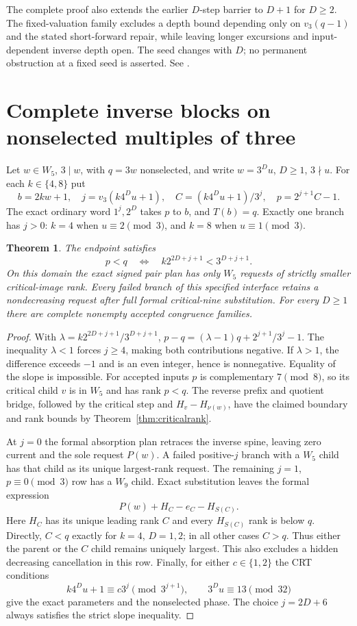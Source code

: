 \documentclass[11pt]{article}
\newtheorem{theorem}{Theorem}
\begin{document}
The complete proof also extends the earlier $D$-step barrier to $D+1$
for $D\ge2$. The fixed-valuation family excludes a depth bound depending
only on $v_3(q-1)$ and the stated short-forward repair, while leaving
longer excursions and input-dependent inverse depth open. The seed
changes with $D$; no permanent obstruction at a fixed seed is asserted.
See
.

\section{Complete inverse blocks on nonselected multiples of three}
Let $w\in W_5$, $3\mid w$, with $q=3w$ nonselected, and write
$w=3^Du$, $D\ge1$, $3\nmid u$. For each $k\in\{4,8\}$ put
\[
 b=2kw+1,\quad j=v_3(k4^Du+1),\quad
 C=(k4^Du+1)/3^j,\quad p=2^{j+1}C-1.
\]
The exact ordinary word $1^j,2^D$ takes $p$ to $b$, and $T(b)=q$.
Exactly one branch has $j>0$: $k=4$ when $u\equiv2\pmod3$, and
$k=8$ when $u\equiv1\pmod3$.

\begin{theorem}\label{thm:multipleinverse}
The endpoint satisfies
\[
 p<q\quad\Longleftrightarrow\quad
 k2^{2D+j+1}<3^{D+j+1}.
\]
On this domain the exact signed pair plan has only $W_5$ requests of
strictly smaller critical-image rank. Every failed branch of this
specified interface retains a nondecreasing request after full formal
critical-nine substitution. For every $D\ge1$ there are complete
nonempty accepted congruence families.
\end{theorem}
\begin{proof}
With $\lambda=k2^{2D+j+1}/3^{D+j+1}$,
$p-q=(\lambda-1)q+2^{j+1}/3^j-1$.
The inequality $\lambda<1$ forces $j\ge4$, making both contributions
negative. If $\lambda>1$, the difference exceeds $-1$ and is an even
integer, hence is nonnegative. Equality of the slope is impossible.
For accepted inputs $p$ is complementary $7\pmod8$, so its critical
child $v$ is in $W_5$ and has rank $p<q$. The reverse prefix and quotient
bridge, followed by the critical step and $H_v-H_{\nu(w)}$, have the
claimed boundary and rank bounds by Theorem~\ref{thm:criticalrank}.

At $j=0$ the formal absorption plan retraces the inverse spine, leaving
zero current and the sole request $P(w)$. A failed positive-$j$ branch
with a $W_5$ child has that child as its unique largest-rank request.
The remaining $j=1$, $p\equiv0\pmod3$ row has a $W_9$ child. Exact
substitution leaves the formal expression
\[
 P(w)+H_C-e_C-H_{S(C)}.
\]
Here $H_C$ has its unique leading rank $C$ and every $H_{S(C)}$ rank is
below $q$. Directly, $C<q$ exactly for $k=4$, $D=1,2$; in all other
cases $C>q$. Thus either the parent or the $C$ child remains uniquely
largest. This also excludes a hidden decreasing cancellation in this row.
Finally, for either $c\in\{1,2\}$ the CRT conditions
\[
 k4^Du+1\equiv c3^j\pmod{3^{j+1}},\qquad
 3^Du\equiv13\pmod{32}
\]
give the exact parameters and the nonselected phase. The choice
$j=2D+6$ always satisfies the strict slope inequality.
\end{proof}
\end{document}
